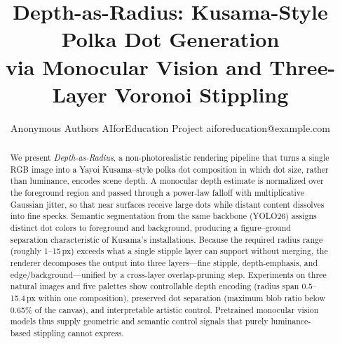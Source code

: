 \documentclass{article}
\title{Depth-as-Radius: Kusama-Style Polka Dot Generation\\
via Monocular Vision and Three-Layer Voronoi Stippling}
\author{
    Anonymous Authors
    \affiliations
    AIforEducation Project
    \emails
    aiforeducation@example.com
}
\begin{document}
\maketitle

\begin{abstract}
We present \emph{Depth-as-Radius}, a non-photorealistic rendering
pipeline that turns a single RGB image into a Yayoi
Kusama--style polka dot composition in which dot size, rather than
luminance, encodes scene depth. A monocular depth estimate is
normalized over the foreground region and passed through a power-law
falloff with multiplicative Gaussian jitter, so that near surfaces
receive large dots while distant content dissolves into fine specks.
Semantic segmentation from the same backbone (YOLO26) assigns distinct
dot colors to foreground and background, producing a figure--ground
separation characteristic of Kusama's installations. Because the
required radius range (roughly 1--15\,px) exceeds what a single
stipple layer can support without merging, the renderer decomposes
the output into three layers---fine stipple, depth-emphasis, and
edge/background---unified by a cross-layer overlap-pruning step.
Experiments on three natural images and five palettes show
controllable depth encoding (radius span 0.5--15.4\,px within one
composition), preserved dot separation (maximum blob ratio below
0.65\% of the canvas), and interpretable artistic control. Pretrained
monocular vision models thus supply geometric and semantic control
signals that purely luminance-based stippling cannot express.
\end{abstract}











\end{document}
